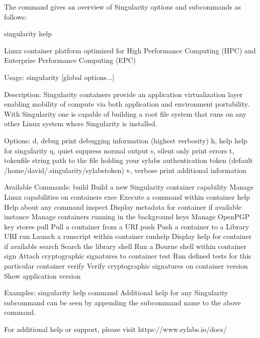 \documentclass[letterpaper,10pt,english]{sphinxmanual}
\begin{document}
The  command gives an overview of Singularity options and subcommands as
follows:

%
\begin{sphinxVerbatim}[commandchars=\\\{\}]
\PYGZdl{} singularity help

Linux container platform optimized for High Performance Computing (HPC) and
Enterprise Performance Computing (EPC)

Usage:
  singularity [global options...]

Description:
  Singularity containers provide an application virtualization layer enabling
  mobility of compute via both application and environment portability. With
  Singularity one is capable of building a root file system that runs on any
  other Linux system where Singularity is installed.

Options:
  \PYGZhy{}d, \PYGZhy{}\PYGZhy{}debug              print debugging information (highest verbosity)
  \PYGZhy{}h, \PYGZhy{}\PYGZhy{}help               help for singularity
  \PYGZhy{}q, \PYGZhy{}\PYGZhy{}quiet              suppress normal output
  \PYGZhy{}s, \PYGZhy{}\PYGZhy{}silent             only print errors
  \PYGZhy{}t, \PYGZhy{}\PYGZhy{}tokenfile string   path to the file holding your sylabs
                           authentication token (default
                           \PYGZdq{}/home/david/.singularity/sylabs\PYGZhy{}token\PYGZdq{})
  \PYGZhy{}v, \PYGZhy{}\PYGZhy{}verbose            print additional information

Available Commands:
  build       Build a new Singularity container
  capability  Manage Linux capabilities on containers
  exec        Execute a command within container
  help        Help about any command
  inspect     Display metadata for container if available
  instance    Manage containers running in the background
  keys        Manage OpenPGP key stores
  pull        Pull a container from a URI
  push        Push a container to a Library URI
  run         Launch a runscript within container
  run\PYGZhy{}help    Display help for container if available
  search      Search the library
  shell       Run a Bourne shell within container
  sign        Attach cryptographic signatures to container
  test        Run defined tests for this particular container
  verify      Verify cryptographic signatures on container
  version     Show application version

Examples:
  \PYGZdl{} singularity help \PYGZlt{}command\PYGZgt{}
      Additional help for any Singularity subcommand can be seen by appending
      the subcommand name to the above command.


For additional help or support, please visit https://www.sylabs.io/docs/
\end{sphinxVerbatim}
\end{document}
